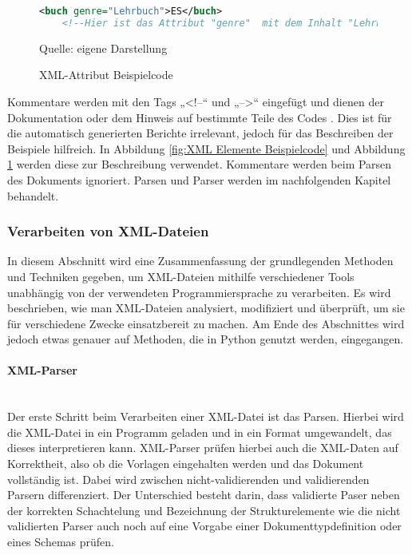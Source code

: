 \begin{figure}[H]
\centering
\begin{minipage}{0.95\textwidth}
\begin{lstlisting}[language=XML]
<buch genre="Lehrbuch">ES</buch>
    <!--Hier ist das Attribut "genre"  mit dem Inhalt "Lehrbuch"-->
\end{lstlisting}
\end{minipage}
\caption{XML-Attribut Beispielcode}
\label{fig: XML Attribute Beispielcode}
    {Quelle: eigene Darstellung}
\end{figure}

Kommentare werden mit den Tags „<!--“ und „-->“ eingefügt und dienen der Dokumentation oder dem Hinweis auf bestimmte Teile des Codes \cite*[10-14]{Becher2022}.
Dies ist für die automatisch generierten Berichte irrelevant, jedoch für das Beschreiben der Beispiele hilfreich.
In Abbildung \ref{fig:XML Elemente Beispielcode} und Abbildung \ref{fig: XML Attribute Beispielcode} werden diese zur Beschreibung verwendet.
Kommentare werden beim Parsen des Dokuments ignoriert.
Parsen und Parser werden im nachfolgenden Kapitel behandelt.

\subsubsection{Verarbeiten von XML-Dateien}
In diesem Abschnitt wird eine Zusammenfassung der grundlegenden Methoden und Techniken gegeben,
um \ac{XML}-Dateien mithilfe verschiedener Tools unabhängig von der verwendeten Programmiersprache zu verarbeiten.
Es wird beschrieben, wie man \ac{XML}-Dateien analysiert, modifiziert und überprüft, um sie für verschiedene Zwecke einsatzbereit zu machen.
Am Ende des Abschnittes wird jedoch etwas genauer auf Methoden, die in Python genutzt werden, eingegangen.


\paragraph{XML-Parser}\mbox{}\\

Der erste Schritt beim Verarbeiten einer \ac{XML}-Datei ist das Parsen.
Hierbei wird die \ac{XML}-Datei in ein Programm geladen und in ein Format umgewandelt, das dieses interpretieren kann.
XML-Parser prüfen hierbei auch die \ac{XML}-Daten auf Korrektheit, also ob die Vorlagen eingehalten werden und das Dokument vollständig ist.
Dabei wird zwischen nicht-validierenden und validierenden Parsern differenziert.
Der Unterschied besteht darin, dass validierte Paser neben der korrekten Schachtelung und Bezeichnung der Strukturelemente
wie die nicht validierten Parser auch noch auf eine Vorgabe einer Dokumenttypdefinition oder eines Schemas prüfen. \cite*[10]{Becher2022}

